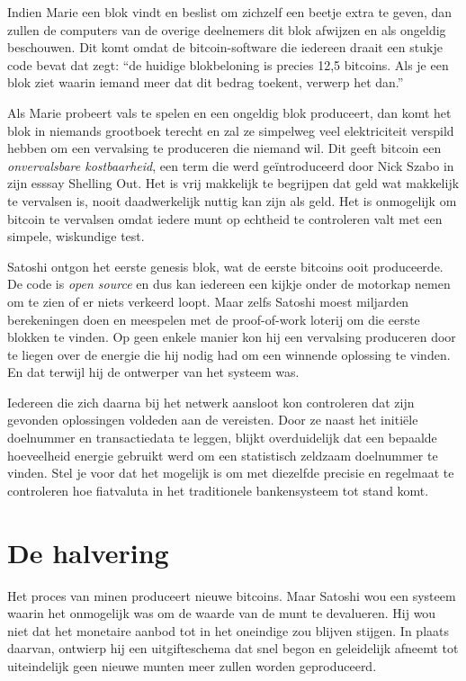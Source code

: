 \documentclass[smalldemyvopaper,11pt,twoside,onecolumn,openright,extrafontsizes]{memoir}
\begin{document}
Indien Marie een blok vindt en beslist om zichzelf een beetje extra te geven, dan zullen de computers van de overige deelnemers dit blok afwijzen en als ongeldig beschouwen. Dit komt omdat de bitcoin-software die iedereen draait een stukje code bevat dat zegt: “de huidige blokbeloning is precies 12,5 bitcoins. Als je een blok ziet waarin iemand meer dat dit bedrag toekent, verwerp het dan.”

Als Marie probeert vals te spelen en een ongeldig blok produceert, dan komt het blok in niemands grootboek terecht en zal ze simpelweg veel elektriciteit verspild hebben om een vervalsing te produceren die niemand wil. Dit geeft bitcoin een \textit{onvervalsbare kostbaarheid}, een term die werd geïntroduceerd door Nick Szabo in zijn esssay \textquotedbl{}Shelling Out\textquotedbl{}. Het is vrij makkelijk te begrijpen dat geld wat makkelijk te vervalsen is, nooit daadwerkelijk nuttig kan zijn als geld. Het is onmogelijk om bitcoin te vervalsen omdat iedere munt op echtheid te controleren valt met een simpele, wiskundige test.

Satoshi ontgon het eerste \textquotedbl{}genesis\textquotedbl{} blok, wat de eerste bitcoins ooit produceerde. De code is \textit{open source} en dus kan iedereen een kijkje onder de motorkap nemen om te zien of er niets verkeerd loopt. Maar zelfs Satoshi moest miljarden berekeningen doen en meespelen met de proof-of-work loterij om die eerste blokken te vinden. Op geen enkele manier kon hij een vervalsing produceren door te liegen over de energie die hij nodig had om een winnende oplossing te vinden. En dat terwijl hij de ontwerper van het systeem was.

Iedereen die zich daarna bij het netwerk aansloot kon controleren dat zijn gevonden oplossingen voldeden aan de vereisten. Door ze naast het initiële doelnummer en transactiedata te leggen, blijkt overduidelijk dat een bepaalde hoeveelheid energie gebruikt werd om een statistisch zeldzaam doelnummer te vinden. Stel je voor dat het mogelijk is om met diezelfde precisie en regelmaat te controleren hoe fiatvaluta in het traditionele bankensysteem tot stand komt.

\section{De halvering}
Het proces van minen produceert nieuwe bitcoins. Maar Satoshi wou een systeem waarin het onmogelijk was om de waarde van de munt te devalueren. Hij wou niet dat het monetaire aanbod tot in het oneindige zou blijven stijgen. In plaats daarvan, ontwierp hij een uitgifteschema dat snel begon en geleidelijk afneemt tot uiteindelijk geen nieuwe munten meer zullen worden geproduceerd.
\end{document}
